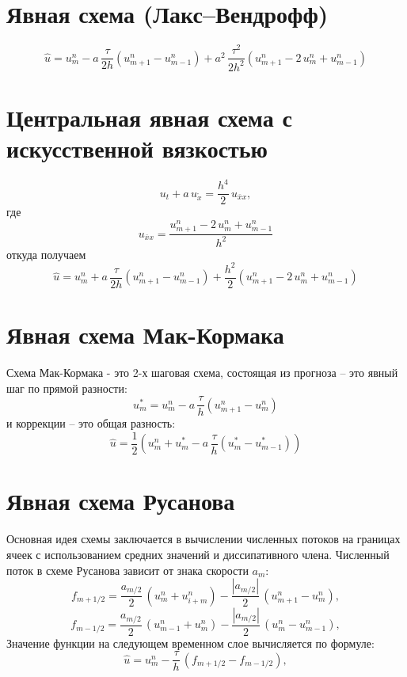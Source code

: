 \documentclass[a4paper,14pt]{extreport}
\begin{document}
\section*{Явная схема (Лакс–Вендрофф)}
\begin{equation}
    \hat{u} = u_m^n - a\,\frac{\tau}{2h}\left(
        u_{m+1}^n-u_{m-1}^n \right)+
    a^2\,\frac{\tau^2}{2h^2}\left(
        u_{m+1}^{n} - 2\,u_m^n + u_{m-1}^n \right)
\end{equation}

\section*{Центральная явная схема с искусственной вязкостью}
\begin{equation}
    u_t + a\,u_{\mathring{x}}=\frac{h^4}{2}\,u_{\bar{x}x},
\end{equation}
где
\[
u_{\bar{x}x} =\frac{u_{m+1}^n - 2\,u_m^n + u_{m-1}^n}{h^2} 
\]
откуда получаем
\begin{equation*}
    \hat{u}=u_m^n + a\,\frac{\tau}{2h}\left(
        u_{m+1}^{n}-u_{m-1}^n \right)
    +\frac{h^2}{2}\left(
        u_{m+1}^n - 2\,u_m^n + u_{m-1}^n \right)
\end{equation*}

\section*{Явная схема Мак-Кормака}
Схема Мак-Кормака - это 2-х шаговая схема, состоящая из прогноза -- это явный шаг по прямой разности:
\begin{equation}
    u_m^* = u_m^n - a\, \frac{\tau}{h}\left(
        u_{m+1}^n-u_m^n\right)
\end{equation}
и коррекции -- это общая разность:
\begin{equation}
    \hat{u} = \frac{1}{2}\left(
        u_m^n + u_m^* - a\,  \frac{\tau}{h}\left(
            u_m^*-u_{m-1}^*\right)
        \right)
\end{equation}

\section*{Явная схема Русанова}
Основная идея схемы заключается в вычислении численных потоков на границах ячеек с использованием средних значений и диссипативного члена.
Численный поток в схеме Русанова зависит от знака скорости \(a_m\):\\
\[
f_{m+1/2} = \frac{a_{m/2}}{2} \,(u_m^n + u_{i+m}^n) - \frac{|a_{m/2}|}{2} \,(u_{m+1}^n - u_m^n),\]
\[
f_{m-1/2} = \frac{a_{m/2}}{2} \,(u_{m-1}^n + u_m^n) - \frac{|a_{m/2}|}{2} \,(u_m^n - u_{m-1}^n),
\]
Значение функции на следующем временном слое вычисляется по формуле:
\begin{equation}
    \hat{u} = u_m^n - \frac{\tau}{h}\,(f_{m+1/2} - f_{m-1/2}), 
\end{equation}
\end{document}
